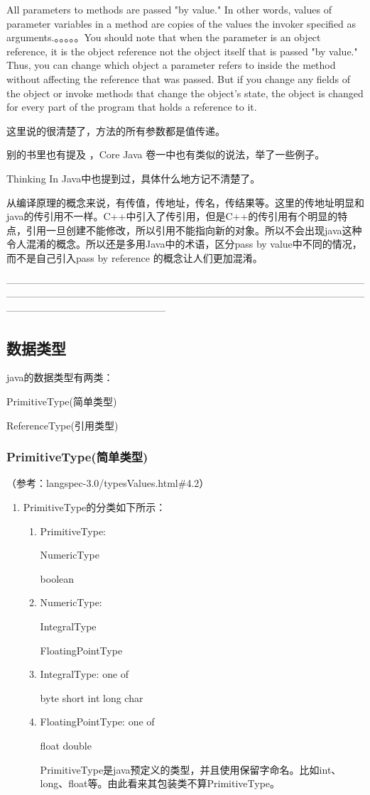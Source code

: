 \documentclass[10pt,b5paper]{article}
\begin{document}
All parameters to methods are passed "by value." In other words, values of parameter variables in a method are copies of the values the invoker specified as arguments.。。。。。You should note that when the parameter is an object reference, it is the object reference not the object itself that is passed "by value." Thus, you can change which object a parameter refers to inside the method without affecting the reference that was passed. But if you change any fields of the object or invoke methods that change the object's state, the object is changed for every part of the program that holds a reference to it.

这里说的很清楚了，方法的所有参数都是值传递。 

别的书里也有提及 ，Core Java 卷一中也有类似的说法，举了一些例子。 

Thinking In Java中也提到过，具体什么地方记不清楚了。 

从编译原理的概念来说，有传值，传地址，传名，传结果等。这里的传地址明显和java的传引用不一样。C++中引入了传引用，但是C++的传引用有个明显的特点，引用一旦创建不能修改，所以引用不能指向新的对象。所以不会出现java这种令人混淆的概念。所以还是多用Java中的术语，区分pass by value中不同的情况，而不是自己引入pass by reference 的概念让人们更加混淆。

————————————————————————————————————————————————————————————————————————————————————————
\subsection{数据类型}
\label{sec-1-6}
java的数据类型有两类：

PrimitiveType(简单类型)

ReferenceType(引用类型)

\subsubsection{PrimitiveType(简单类型)}
\label{sec-1-6-1}
（参考：langspec-3.0/typesValues.html\#4.2）

\begin{enumerate}
\item PrimitiveType的分类如下所示：
\label{sec-1-6-1-1}
\begin{enumerate}
\item PrimitiveType:
\label{sec-1-6-1-1-1}

NumericType

boolean
\item NumericType:
\label{sec-1-6-1-1-2}

IntegralType

FloatingPointType
\item IntegralType:
\label{sec-1-6-1-1-3}
one of

byte short int long char
\item FloatingPointType:
\label{sec-1-6-1-1-4}
one of

float double

PrimitiveType是java预定义的类型，并且使用保留字命名。比如int、long、float等。由此看来其包装类不算PrimitiveType。
\end{enumerate}
\end{enumerate}
\end{document}
